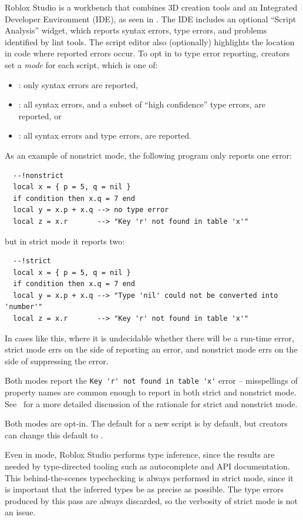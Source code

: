 \documentclass[english,submission,cleveref]{programming}
\begin{document}

{Roblox Studio} is a workbench that
combines {3D creation} tools and an Integrated
Developer Environment (IDE), as seen in .
The IDE includes an optional ``Script Analysis'' widget, which
reports syntax errors, type errors, and problems identified by
lint tools. The script editor also (optionally) highlights
the location in code where reported errors occur.
To opt in to type error reporting, creators set a \emph{mode}
for each script, which is one of:
\begin{itemize}
  \item \mnocheck{}: only syntax errors are reported,
  \item \mnonstrict{}: all syntax errors, and a subset of ``high confidence'' type errors, are reported, or
  \item \mstrict{}: all syntax errors and type errors, are reported.
\end{itemize}
As an example of nonstrict mode, the following program only reports one error:
\begin{verbatim}
  --!nonstrict
  local x = { p = 5, q = nil }
  if condition then x.q = 7 end
  local y = x.p + x.q --> no type error
  local z = x.r       --> "Key 'r' not found in table 'x'"
\end{verbatim}
but in strict mode it reports two:
\begin{verbatim}
  --!strict
  local x = { p = 5, q = nil }
  if condition then x.q = 7 end
  local y = x.p + x.q --> "Type 'nil' could not be converted into 'number'"
  local z = x.r       --> "Key 'r' not found in table 'x'"
\end{verbatim}
In cases like this, where it is undecidable whether there will be a run-time error,
strict mode errs on the side of reporting an error, and nonstrict mode errs on
the side of suppressing the error.

Both modes report the \verb|Key 'r' not found in table 'x'| error --
misspellings of property names are common enough to report in both
strict and nonstrict mode. See~\cite{bfj-hatra-2021}
for a more detailed discussion of the rationale for strict and nonstrict mode.

Both modes are opt-in. The default for a new script is \mnocheck{} by
default, but creators can change this default to \mnonstrict{}.

Even in \mnocheck{} mode, {Roblox Studio} performs type inference, since
the results are needed by type-directed tooling such as autocomplete and
API documentation. This behind-the-scenes typechecking is always performed
in strict mode, since it is important that the inferred types be as precise
as possible. The type errors produced by this pass are always discarded,
so the verbosity of strict mode is not an issue.
\end{document}
